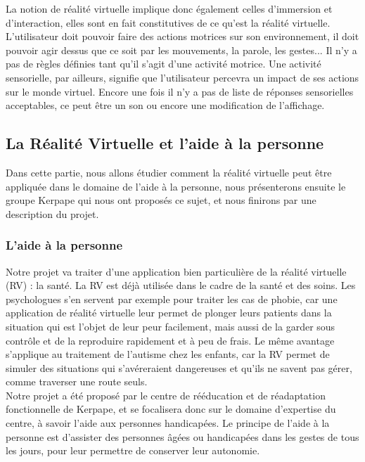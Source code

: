 La notion de réalité virtuelle implique donc également celles d'immersion et d'interaction, elles sont en fait constitutives de ce qu'est la réalité virtuelle. L'utilisateur doit pouvoir faire des actions motrices sur son environnement, il doit pouvoir agir dessus que ce soit par les mouvements, la parole, les gestes... Il n'y a pas de règles définies tant qu'il s'agit d'une activité motrice.
Une activité sensorielle, par ailleurs, signifie que l'utilisateur percevra un impact de ses actions sur le monde virtuel. Encore une fois il n'y a pas de liste de réponses sensorielles acceptables, ce peut être un son ou encore une modification de l'affichage.


\subsection{La Réalité Virtuelle et l'aide à la personne}

Dans cette partie, nous allons étudier comment la réalité virtuelle peut être appliquée dans le domaine de l'aide à la personne, nous présenterons ensuite le groupe Kerpape qui nous ont proposés ce sujet, et nous finirons par une description du projet.

\subsubsection{L'aide à la personne}

Notre projet va traiter d'une application bien particulière de la réalité virtuelle (RV) : la santé. La RV est déjà utilisée dans le cadre de la santé et des soins. Les psychologues s'en servent par exemple pour traiter les cas de phobie, car une application de réalité virtuelle leur permet de plonger leurs patients dans la situation qui est l'objet de leur peur facilement, mais aussi de la garder sous contrôle et de la reproduire rapidement et à peu de frais. Le même avantage s'applique au traitement de l'autisme chez les enfants, car la RV permet de simuler des situations qui s'avéreraient dangereuses et qu'ils ne savent pas gérer, comme traverser une route seuls.\cite{traiteRV4}\\

Notre projet a été proposé par le centre de rééducation et de réadaptation fonctionnelle de Kerpape, et se focalisera donc sur le domaine d'expertise du centre, à savoir l'aide aux personnes handicapées. Le principe de l'aide à la personne est d'assister des personnes âgées ou handicapées dans les gestes de tous les jours, pour leur permettre de conserver leur autonomie.

